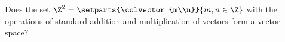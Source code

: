 %
Does the set $\Z^2 = \setparts{\colvector{m\\n}}{m,n\in\Z}$ with the operations of standard addition and multiplication of vectors form a vector space?